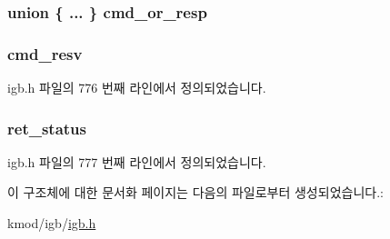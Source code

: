 \subsubsection[{\texorpdfstring{cmd\+\_\+or\+\_\+resp}{cmd_or_resp}}]{\setlength{\rightskip}{0pt plus 5cm}union \{ ... \}   cmd\+\_\+or\+\_\+resp}\hypertarget{structe1000__fw__hdr_a5577bc945674668f99476fb1fc958607}{}\label{structe1000__fw__hdr_a5577bc945674668f99476fb1fc958607}
\subsubsection[{\texorpdfstring{cmd\+\_\+resv}{cmd_resv}}]{ cmd\+\_\+resv}\hypertarget{structe1000__fw__hdr_a42cdfda0c626a679500e9513e311da26}{}\label{structe1000__fw__hdr_a42cdfda0c626a679500e9513e311da26}


igb.\+h 파일의 776 번째 라인에서 정의되었습니다.

\subsubsection[{\texorpdfstring{ret\+\_\+status}{ret_status}}]{ ret\+\_\+status}\hypertarget{structe1000__fw__hdr_a51c1ffde907ed7679f94d356a144da03}{}\label{structe1000__fw__hdr_a51c1ffde907ed7679f94d356a144da03}


igb.\+h 파일의 777 번째 라인에서 정의되었습니다.



이 구조체에 대한 문서화 페이지는 다음의 파일로부터 생성되었습니다.\+:\begin{DoxyCompactItemize}
\item 
kmod/igb/\hyperlink{kmod_2igb_2igb_8h}{igb.\+h}\end{DoxyCompactItemize}
